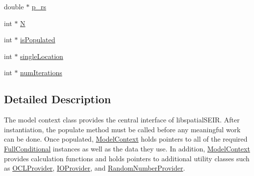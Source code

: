 \begin{DoxyCompactItemize}
\item 
double $\ast$ \hyperlink{classSpatialSEIR_1_1ModelContext_a07133c92757c4de3a525ad921de527d5}{p\-\_\-rs}
\item 
int $\ast$ \hyperlink{classSpatialSEIR_1_1ModelContext_a170b3ee4076d929c5e8012765f825eed}{N}
\item 
int $\ast$ \hyperlink{classSpatialSEIR_1_1ModelContext_a698a8889db239e919323d764775a2148}{is\-Populated}
\item 
int $\ast$ \hyperlink{classSpatialSEIR_1_1ModelContext_a1bf4c4a975e9e060ef30b8c7be14b563}{single\-Location}
\item 
int $\ast$ \hyperlink{classSpatialSEIR_1_1ModelContext_aa8b6063ce0c31c485b42b2de28317ca4}{num\-Iterations}
\end{DoxyCompactItemize}


\subsection{Detailed Description}
The model context class provides the central interface of libspatial\-S\-E\-I\-R. After instantiation, the populate method must be called before any meaningful work can be done. Once populated, \hyperlink{classSpatialSEIR_1_1ModelContext}{Model\-Context} holds pointers to all of the required \hyperlink{classSpatialSEIR_1_1FullConditional}{Full\-Conditional} instances as well as the data they use. In addition, \hyperlink{classSpatialSEIR_1_1ModelContext}{Model\-Context} provides calculation functions and holds pointers to additional utility classes such as \hyperlink{classSpatialSEIR_1_1OCLProvider}{O\-C\-L\-Provider}, \hyperlink{classSpatialSEIR_1_1IOProvider}{I\-O\-Provider}, and \hyperlink{classSpatialSEIR_1_1RandomNumberProvider}{Random\-Number\-Provider}. 

